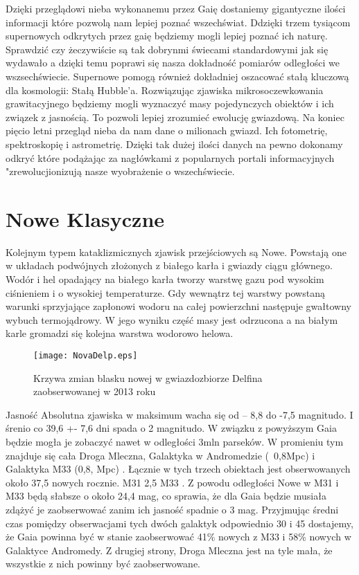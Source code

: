 \documentclass[polish,12pt]{pracamgr}
\begin{document}
Dzięki przeglądowi nieba wykonanemu przez Gaię dostaniemy gigantyczne ilości informacji które pozwolą nam lepiej poznać wszechświat. Ddzięki trzem tysiącom supernowych odkrytych przez gaię będziemy mogli lepiej poznać ich naturę. Sprawdzić czy żeczywiście są tak dobrynmi świecami standardowymi jak się wydawało a dzięki temu poprawi się nasza dokładność pomiarów odległości we wszsechświecie. Supernowe pomogą również dokładniej oszacować stałą kluczową dla kosmologii: Stałą Hubble'a. Rozwiązując zjawiska mikrosoczewkowania grawitacyjnego będziemy mogli wyznaczyć masy pojedynczych obiektów i ich związek z jasnością. To pozwoli lepiej zrozumieć ewolucję gwiazdową. Na koniec pięcio letni przegląd nieba da nam dane o milionach gwiazd. Ich fotometrię, spektroskopię i astrometrię. Dzięki tak dużej ilości danych na pewno dokonamy odkryć które podążając za nagłówkami z popularnych portali informacyjnych "zrewolucjionizują nasze wyobrażenie o wszechświecie.





\section{Nowe Klasyczne}
Kolejnym typem kataklizmicznych zjawisk przejściowych są Nowe. Powstają one w układach podwójnych złożonych z białego karła i gwiazdy ciągu głównego. Wodór i hel opadający na białego karła tworzy warstwę gazu pod wysokim ciśnieniem i o wysokiej temperaturze. Gdy wewnątrz tej warstwy powstaną warunki sprzyjające zapłonowi wodoru na całej powierzchni następuje gwałtowny wybuch termojądrowy. W jego wyniku część masy jest odrzucona a na białym karle gromadzi się kolejna warstwa wodorowo helowa. 
\begin{figure}[!h]
\centering
\texttt{[image: NovaDelp.eps]}
\caption{Krzywa zmian blasku nowej w gwiazdozbiorze Delfina zaobserwowanej w 2013 roku}
\label{Krzywa zmian blasku gwiazdy U GeM.}
\end{figure}
Jasność Absolutna zjawiska w maksimum wacha się od – 8,8 do -7,5 magnitudo. I śrenio co 39,6 +- 7,6 dni spada o 2 magnitudo. W związku z powyższym Gaia będzie mogła je zobaczyć nawet w odległości 3mln parseków. W promieniu tym znajduje się cała Droga Mleczna, Galaktyka w Andromedzie (~0,8Mpc) i Galaktyka M33 (0,8, Mpc) .  Łącznie w tych trzech obiektach jest obserwowanych około 37,5 nowych rocznie.  M31 2,5 M33 . Z powodu odległości Nowe w M31 i M33 będą słabsze o około 24,4 mag, co sprawia, że dla Gaia będzie musiała zdążyć je zaobserwować zanim ich jasność spadnie o 3 mag. Przyjmując średni czas pomiędzy obserwacjami tych dwóch galaktyk odpowiednio 30 i 45 dostajemy, że Gaia powinna być w stanie zaobserwować 41\%  nowych z M33 i 58\% nowych w Galaktyce Andromedy.  Z  drugiej strony, Droga Mleczna jest na tyle mała, że wszystkie z nich powinny być zaobserwowane.
\end{document}
